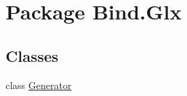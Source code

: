 \hypertarget{namespace_bind_1_1_glx}{
\section{Package Bind.Glx}
\label{namespace_bind_1_1_glx}
}
\subsection*{Classes}
\begin{DoxyCompactItemize}
\item 
class \hyperlink{class_bind_1_1_glx_1_1_generator}{Generator}
\end{DoxyCompactItemize}
